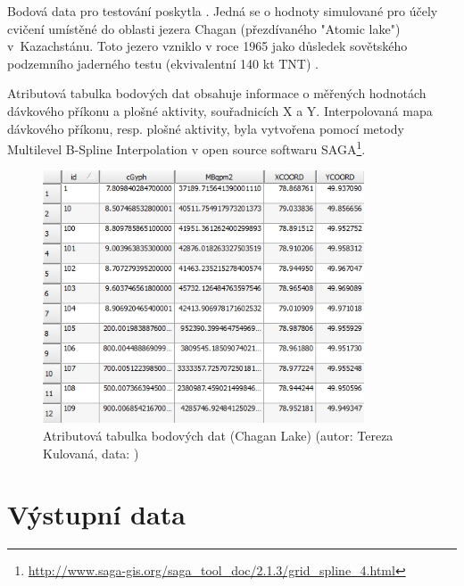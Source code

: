 Bodová data pro testování poskytla . Jedná se o hodnoty
simulované pro účely cvičení umístěné do oblasti jezera Chagan
(přezdívaného "Atomic lake") v~Kazachstánu. Toto jezero vzniklo v roce
1965 jako důsledek sovětského podzemního jader\-ného testu (ekvivalentní
140 kt TNT) \cite{Nordyke2000}.

Atributová tabulka bodových dat obsahuje informace o měřených
hodnotách dávkového příkonu a plošné aktivity, souřadnicích X a
Y. Interpolovaná mapa dávko\-vého příkonu, resp. plošné aktivity, byla
vytvořena pomocí metody Multilevel B-Spline Interpolation v open
source  softwaru
SAGA\footnote{\url{http://www.saga-gis.org/saga_tool_doc/2.1.3/grid_spline_4.html}}.
  
\begin{figure}[H] \centering
      \includegraphics[width=270pt]{./pictures/chagan_attr.jpg}
      \caption[Atributová tabulka bodových dat (Chagan
      Lake)]{Atributová tabulka bodových dat (Chagan Lake) (autor:
        Tereza Kulovaná, data: )}
      \label{fig:attributes}
\end{figure}

\section{Výstupní data}

